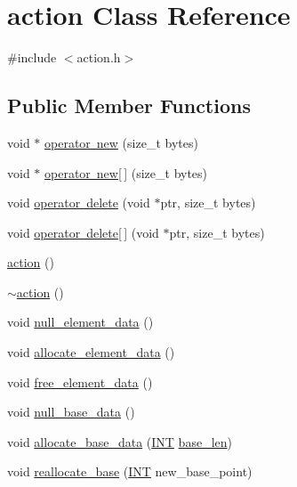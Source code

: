 \hypertarget{classaction}{}\section{action Class Reference}
\label{classaction}


{\ttfamily \#include $<$action.\+h$>$}

\subsection*{Public Member Functions}
\begin{DoxyCompactItemize}
\item 
void $\ast$ \mbox{\hyperlink{classaction_a075a7c4866b659ccb3af04569ae9e59d}{operator new}} (size\+\_\+t bytes)
\item 
void $\ast$ \mbox{\hyperlink{classaction_a90bb958cc0073b8c46f246f256428514}{operator new\mbox{[}$\,$\mbox{]}}} (size\+\_\+t bytes)
\item 
void \mbox{\hyperlink{classaction_a41130e4f504419cdd6720fc55e509f1e}{operator delete}} (void $\ast$ptr, size\+\_\+t bytes)
\item 
void \mbox{\hyperlink{classaction_ad0cc09cee17deeb2fa74b219e7920122}{operator delete\mbox{[}$\,$\mbox{]}}} (void $\ast$ptr, size\+\_\+t bytes)
\item 
\mbox{\hyperlink{classaction_a108adb38ad362aeb55cf40b9de38bb16}{action}} ()
\item 
\mbox{\hyperlink{classaction_ab6f76ca0e49cfd012d51036f32e86116}{$\sim$action}} ()
\item 
void \mbox{\hyperlink{classaction_a90cd98bea15f55a3c25cb9c6b68685df}{null\+\_\+element\+\_\+data}} ()
\item 
void \mbox{\hyperlink{classaction_adc5f98db8315bfd17fcd2fbb437d8f60}{allocate\+\_\+element\+\_\+data}} ()
\item 
void \mbox{\hyperlink{classaction_a0525616f907783df74d020e0db13cca3}{free\+\_\+element\+\_\+data}} ()
\item 
void \mbox{\hyperlink{classaction_a09d62a3dd408d1c0704b380b26f72fb0}{null\+\_\+base\+\_\+data}} ()
\item 
void \mbox{\hyperlink{classaction_a345fa8dfbb60c8a100ab4dd80a966b1b}{allocate\+\_\+base\+\_\+data}} (\mbox{\hyperlink{galois_8h_a09fddde158a3a20bd2dcadb609de11dc}{I\+NT}} \mbox{\hyperlink{classaction_ae9343b53031fe407e5d4d0eff1fc62b6}{base\+\_\+len}})
\item 
void \mbox{\hyperlink{classaction_a59ea889d3aa9e9aee86ffee6b7785bfd}{reallocate\+\_\+base}} (\mbox{\hyperlink{galois_8h_a09fddde158a3a20bd2dcadb609de11dc}{I\+NT}} new\+\_\+base\+\_\+point)

\end{DoxyCompactItemize}
